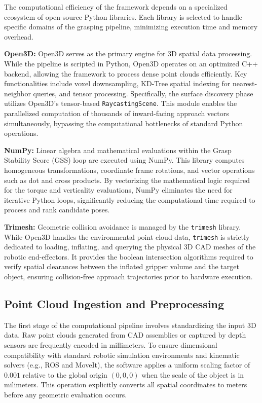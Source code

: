 The computational efficiency of the framework depends on a specialized ecosystem of open-source Python libraries. Each library is selected to handle specific domains of the grasping pipeline, minimizing execution time and memory overhead.

\textbf{Open3D:} Open3D serves as the primary engine for 3D spatial data processing. While the pipeline is scripted in Python, Open3D operates on an optimized C++ backend, allowing the framework to process dense point clouds efficiently. Key functionalities include voxel downsampling, KD-Tree spatial indexing for nearest-neighbor queries, and tensor processing. Specifically, the surface discovery phase utilizes Open3D's tensor-based \texttt{RaycastingScene}. This module enables the parallelized computation of thousands of inward-facing approach vectors simultaneously, bypassing the computational bottlenecks of standard Python operations.

\textbf{NumPy:} Linear algebra and mathematical evaluations within the Grasp Stability Score (GSS) loop are executed using NumPy. This library computes homogeneous transformations, coordinate frame rotations, and vector operations such as dot and cross products. By vectorizing the mathematical logic required for the torque and verticality evaluations, NumPy eliminates the need for iterative Python loops, significantly reducing the computational time required to process and rank candidate poses.

\textbf{Trimesh:} Geometric collision avoidance is managed by the \texttt{trimesh} library. While Open3D handles the environmental point cloud data, \texttt{trimesh} is strictly dedicated to loading, inflating, and querying the physical 3D CAD meshes of the robotic end-effectors. It provides the boolean intersection algorithms required to verify spatial clearances between the inflated gripper volume and the target object, ensuring collision-free approach trajectories prior to hardware execution.


\subsection{Point Cloud Ingestion and Preprocessing}

The first stage of the computational pipeline involves standardizing the input 3D data. Raw point clouds generated from CAD assemblies or captured by depth sensors are frequently encoded in millimeters. To ensure dimensional compatibility with standard robotic simulation environments and kinematic solvers (e.g., ROS and MoveIt), the software applies a uniform scaling factor of $0.001$ relative to the global origin $(0, 0, 0)$ when the scale of the object is in milimeters. This operation explicitly converts all spatial coordinates to meters before any geometric evaluation occurs.


